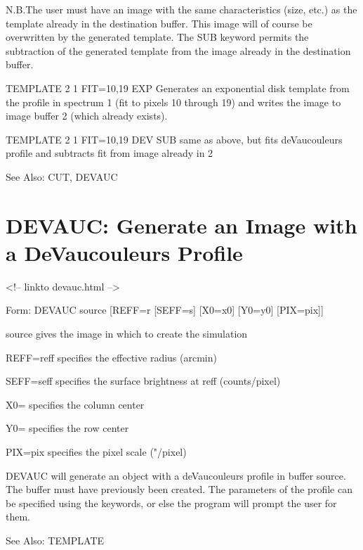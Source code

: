N.B.The user must have an image with the same characteristics (size, etc.)
as the template already in the destination buffer.  This image will of
course be overwritten by the generated template.  The SUB keyword permits
the subtraction of the generated template from the image already in the
destination buffer.

\begin{example}
  \item[TEMPLATE 2 1 FIT=10,19 EXP\hfill]{Generates an exponential disk
       template from the profile in spectrum 1 (fit to pixels 10 through
       19) and writes the image to image buffer 2 (which already exists).}

  \item[TEMPLATE 2 1 FIT=10,19 DEV SUB \hfill]{same as above, but fits
       deVaucouleurs profile and subtracts fit from image already in 2}
\end{example}

See Also: CUT, DEVAUC


\section{DEVAUC: Generate an Image with a DeVaucouleurs Profile}
\begin{rawhtml}
<!-- linkto devauc.html -->
\end{rawhtml}
\begin{command}
  \item[Form: DEVAUC source [REFF=r] [SEFF=s] [X0=x0] [Y0=y0] 
       [PIX=pix]\hfill]{}
  \item[source]{gives the image in which to create the simulation}
  \item[REFF=reff]{specifies the effective radius (arcmin)}
  \item[SEFF=seff]{specifies the surface brightness at reff (counts/pixel)}
  \item[X0=]{specifies the column center}
  \item[Y0=]{specifies the row center}
  \item[PIX=pix]{specifies the pixel scale ("/pixel)}
\end{command}

DEVAUC will generate an object with a deVaucouleurs profile in buffer
source. The buffer must have previously been created. The parameters of the
profile can be specified using the keywords, or else the program will
prompt the user for them.

See Also:  TEMPLATE
